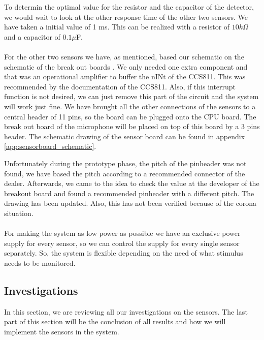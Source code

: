 \documentclass[11pt,a4paper]{article}
\begin{document}
To determin the optimal value for the resistor and the capacitor of the detector, we would wait to look at the other response time of the other two sensors. We have taken a initial value of 1 ms. This can be realized with a resistor of $ 10 k\Omega$ and a capacitor of $0.1 \mu$F.
\\ \\
For the other two sensors we have, as mentioned, based our schematic on the schematic of the break out boards \cite{bib:AMG8833_schematic} \cite{bib:CCS811_schematic}. We only needed one extra component and that was an operational amplifier to buffer the nINt of the CCS811. This was recommended by the documentation of the CCS811. Also, if this interrupt function is not desired, we can just remove this part of the circuit and the system will work just fine. We have brought all the other connections of the sensors to a central header of 11 pins, so the board can be plugged onto the CPU board. The break out board of the microphone will be placed on top of this board by a 3 pins header.  The schematic drawing of the sensor board can be found in appendix \ref{app:sensorboard_schematic}.

Unfortunately during the prototype phase, the pitch of the pinheader was not found, we have based the pitch according to a recommended connector of the dealer. Afterwards, we came to the idea to check the value at the developer of the breakout board and found a recommended pinheader with a different pitch. The drawing has been updated. Also, this has not been verified because of the corona situation.
\\ \\
For making the system as low power as possible we have an exclusive power supply for every sensor, so we can control the supply for every single sensor separately.
So, the system is flexible depending on the need of what stimulus needs to be monitored.

\subsection{Investigations}
In this section, we are reviewing all our investigations on the sensors. The last part of this section will be the conclusion of all results and how we will implement the sensors in the system.
\end{document}
